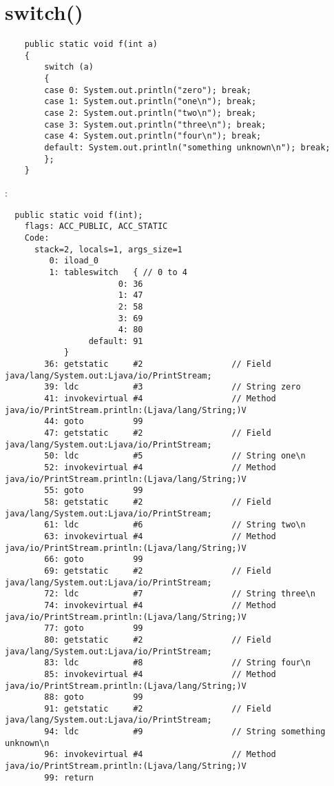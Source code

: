 \section{switch()}


\begin{lstlisting}
	public static void f(int a)
	{
		switch (a)
		{
		case 0: System.out.println("zero"); break;
		case 1: System.out.println("one\n"); break;
		case 2: System.out.println("two\n"); break;
		case 3: System.out.println("three\n"); break;
		case 4: System.out.println("four\n"); break;
		default: System.out.println("something unknown\n"); break;
		};
	}
\end{lstlisting}

:

\begin{lstlisting}
  public static void f(int);
    flags: ACC_PUBLIC, ACC_STATIC
    Code:
      stack=2, locals=1, args_size=1
         0: iload_0       
         1: tableswitch   { // 0 to 4
                       0: 36
                       1: 47
                       2: 58
                       3: 69
                       4: 80
                 default: 91
            }
        36: getstatic     #2                  // Field java/lang/System.out:Ljava/io/PrintStream;
        39: ldc           #3                  // String zero
        41: invokevirtual #4                  // Method java/io/PrintStream.println:(Ljava/lang/String;)V
        44: goto          99
        47: getstatic     #2                  // Field java/lang/System.out:Ljava/io/PrintStream;
        50: ldc           #5                  // String one\n
        52: invokevirtual #4                  // Method java/io/PrintStream.println:(Ljava/lang/String;)V
        55: goto          99
        58: getstatic     #2                  // Field java/lang/System.out:Ljava/io/PrintStream;
        61: ldc           #6                  // String two\n
        63: invokevirtual #4                  // Method java/io/PrintStream.println:(Ljava/lang/String;)V
        66: goto          99
        69: getstatic     #2                  // Field java/lang/System.out:Ljava/io/PrintStream;
        72: ldc           #7                  // String three\n
        74: invokevirtual #4                  // Method java/io/PrintStream.println:(Ljava/lang/String;)V
        77: goto          99
        80: getstatic     #2                  // Field java/lang/System.out:Ljava/io/PrintStream;
        83: ldc           #8                  // String four\n
        85: invokevirtual #4                  // Method java/io/PrintStream.println:(Ljava/lang/String;)V
        88: goto          99
        91: getstatic     #2                  // Field java/lang/System.out:Ljava/io/PrintStream;
        94: ldc           #9                  // String something unknown\n
        96: invokevirtual #4                  // Method java/io/PrintStream.println:(Ljava/lang/String;)V
        99: return        
\end{lstlisting}
